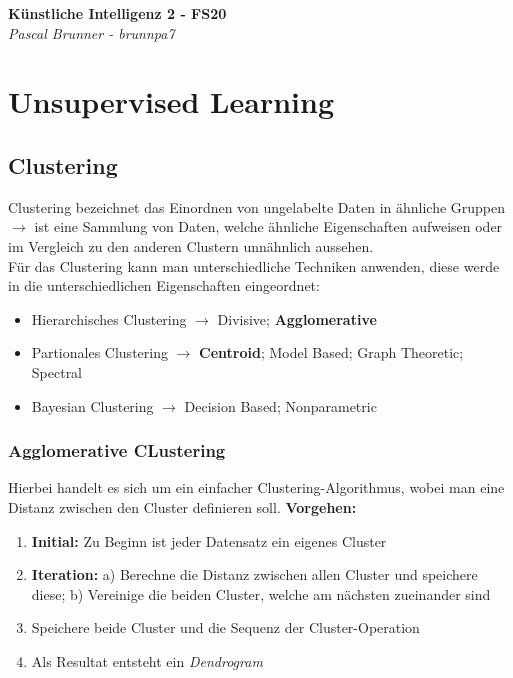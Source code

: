 \documentclass{article}
\theoremstyle{merke}
\theoremstyle{definition}
\begin{document}
\begin{titlepage}
   \begin{center}
      \Large\textbf{Künstliche Intelligenz 2 - FS20}\\
      \large\textit{Pascal Brunner - brunnpa7}
   \end{center}
\end{titlepage}


\tableofcontents
\newpage

\chapter{Unsupervised Learning}

    \section{Clustering}
    Clustering bezeichnet das Einordnen von ungelabelte Daten in ähnliche Gruppen $\rightarrow$ ist eine Sammlung von Daten, welche ähnliche Eigenschaften aufweisen oder im Vergleich zu den anderen Clustern unnähnlich aussehen.\\
    Für das Clustering kann man unterschiedliche Techniken anwenden, diese werde in die unterschiedlichen Eigenschaften eingeordnet:
    \begin{itemize}
        \item Hierarchisches Clustering $\rightarrow$ Divisive; \textbf{Agglomerative}
        \item Partionales Clustering $\rightarrow$ \textbf{Centroid}; Model Based; Graph Theoretic; Spectral
        \item Bayesian Clustering $\rightarrow$ Decision Based; Nonparametric
    \end{itemize}

        \subsection{Agglomerative CLustering}
        Hierbei handelt es sich um ein einfacher Clustering-Algorithmus, wobei man eine Distanz zwischen den Cluster definieren soll.
        \textbf{Vorgehen:}
        \begin{enumerate}
            \item \textbf{Initial:} Zu Beginn ist jeder Datensatz ein eigenes Cluster
            \item \textbf{Iteration:} a) Berechne die Distanz zwischen allen Cluster und speichere diese; b) Vereinige die beiden Cluster, welche am nächsten zueinander sind
            \item Speichere beide Cluster und die Sequenz der Cluster-Operation
            \item Als Resultat entsteht ein \textit{Dendrogram}
        \end{enumerate}
\end{document}

